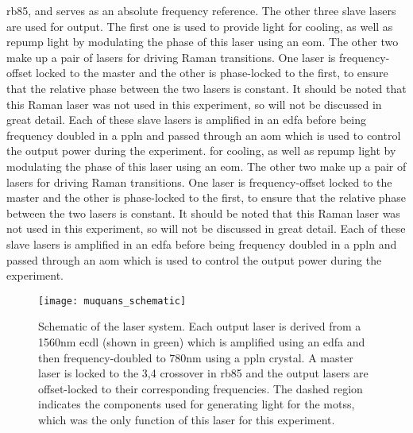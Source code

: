 \ac{rb85}, and serves as an absolute frequency reference. The other three slave lasers are used for output. The first one is used to provide light for cooling, as well as repump light by modulating the phase of this laser using an \ac{eom}. The other two make up a pair of lasers for driving Raman transitions. One laser is frequency-offset locked to the master and the other is phase-locked to the first, to ensure that the relative phase between the two lasers is constant. It should be noted that this Raman laser was not used in this experiment, so will not be discussed in great detail. Each of these slave lasers is amplified in an \ac{edfa} before being frequency doubled in a \ac{ppln} and passed through an \ac{aom} which is used to control the output power during the experiment.  for cooling, as well as repump light by modulating the phase of this laser using an \ac{eom}. The other two make up a pair of lasers for driving Raman transitions. One laser is frequency-offset locked to the master and the other is phase-locked to the first, to ensure that the relative phase between the two lasers is constant. It should be noted that this Raman laser was not used in this experiment, so will not be discussed in great detail. Each of these slave lasers is amplified in an \ac{edfa} before being frequency doubled in a \ac{ppln} and passed through an \ac{aom} which is used to control the output power during the experiment. 
\begin{figure}
    \texttt{[image: muquans\_schematic]}
    \caption[\Muquans Laser System Diagram]{Schematic of the \Muquans laser system. Each output laser is derived from a 1560nm \acs{ecdl} (shown in green) which is amplified using an \acs{edfa} and then frequency-doubled to 780nm using a \acs{ppln} crystal. A master laser is locked to the 3,4 crossover in \ac{rb85} and the output lasers are offset-locked to their corresponding frequencies. The dashed region indicates the components used for generating light for the \acp{mots}, which was the only function of this laser for this experiment.}\label{fig:muquans_schematic}
\end{figure}
